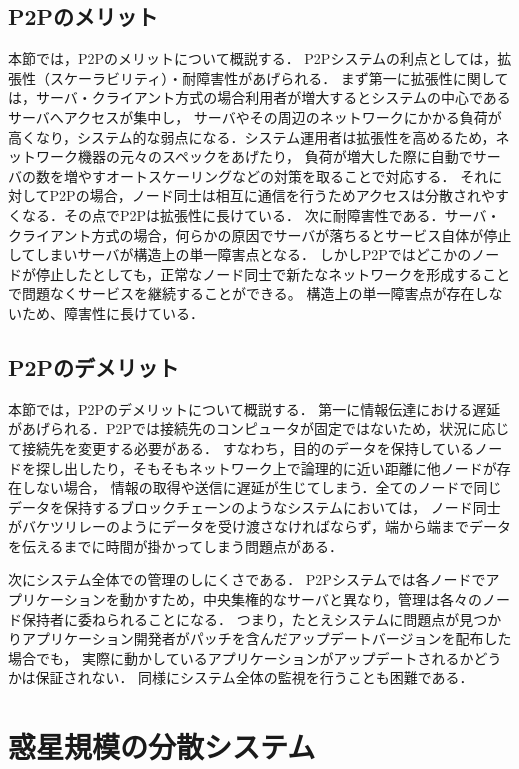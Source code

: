 \subsection{P2Pのメリット}

本節では，P2Pのメリットについて概説する．
P2Pシステムの利点としては，拡張性（スケーラビリティ）・耐障害性があげられる．
まず第一に拡張性に関しては，サーバ・クライアント方式の場合利用者が増大するとシステムの中心であるサーバへアクセスが集中し，
サーバやその周辺のネットワークにかかる負荷が高くなり，システム的な弱点になる．システム運用者は拡張性を高めるため，ネットワーク機器の元々のスペックをあげたり，
負荷が増大した際に自動でサーバの数を増やすオートスケーリングなどの対策を取ることで対応する．
それに対してP2Pの場合，ノード同士は相互に通信を行うためアクセスは分散されやすくなる．その点でP2Pは拡張性に長けている．
次に耐障害性である．サーバ・クライアント方式の場合，何らかの原因でサーバが落ちるとサービス自体が停止してしまいサーバが構造上の単一障害点となる．
しかしP2Pではどこかのノードが停止したとしても，正常なノード同士で新たなネットワークを形成することで問題なくサービスを継続することができる。
構造上の単一障害点が存在しないため、障害性に長けている．

\subsection{P2Pのデメリット}

本節では，P2Pのデメリットについて概説する．
第一に情報伝達における遅延があげられる．P2Pでは接続先のコンピュータが固定ではないため，状況に応じて接続先を変更する必要がある．
すなわち，目的のデータを保持しているノードを探し出したり，そもそもネットワーク上で論理的に近い距離に他ノードが存在しない場合，
情報の取得や送信に遅延が生じてしまう．全てのノードで同じデータを保持するブロックチェーンのようなシステムにおいては，
ノード同士がバケツリレーのようにデータを受け渡さなければならず，端から端までデータを伝えるまでに時間が掛かってしまう問題点がある．

次にシステム全体での管理のしにくさである．
P2Pシステムでは各ノードでアプリケーションを動かすため，中央集権的なサーバと異なり，管理は各々のノード保持者に委ねられることになる．
つまり，たとえシステムに問題点が見つかりアプリケーション開発者がパッチを含んだアップデートバージョンを配布した場合でも，
実際に動かしているアプリケーションがアップデートされるかどうかは保証されない．
同様にシステム全体の監視を行うことも困難である．

\section{惑星規模の分散システム}

